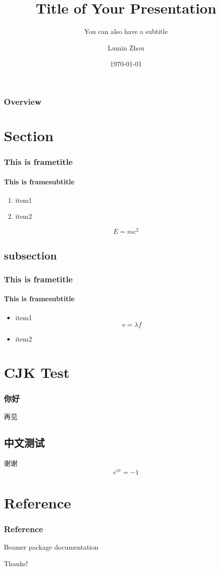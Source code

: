 \documentclass{beamer}
\title{Title of Your Presentation}
\subtitle{You can also have a subtitle}
\author{Lumin Zhou}
\institute{Example Organization}
\date{\today}
\begin{document}
\begin{CJK}{UTF8}{gkai}

\begin{frame}
 \titlepage
\end{frame}

\begin{frame}
 \frametitle{Overview}
 \tableofcontents
\end{frame}

\section{Section}

\begin{frame}
 \frametitle{This is frametitle}
 \framesubtitle{This is framesubtitle}
 \begin{enumerate}
  \item item1
  \item item2
 \end{enumerate}
 \[ E = mc^2 \]
\end{frame}

\subsection{subsection}

\begin{frame}
 \frametitle{This is frametitle}
 \framesubtitle{This is framesubtitle}
 \begin{itemize}
  \item item1
   \[ v = \lambda f \]
  \item item2
 \end{itemize}
\end{frame}

\section{CJK Test}

\begin{frame}
 \frametitle{你好}
 再见
\end{frame}

\subsection{中文测试}

\begin{frame}
 谢谢
 $$ e^{i\pi} = -1 $$
\end{frame}

\section{Reference}

\begin{frame}
 \frametitle{Reference}
 \begin{thebibliography}{10}
   Beamer package documentation
 \end{thebibliography}
\end{frame}

\begin{frame}
 \centering \Huge Thanks!
\end{frame}

\end{CJK}
\end{document}
